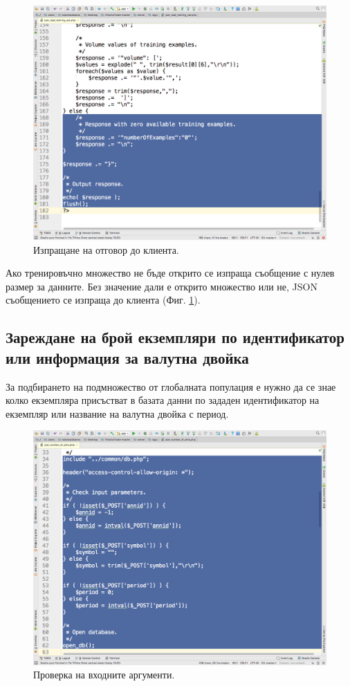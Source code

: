 \documentclass[book,14pt,oneside,openany]{memoir}
\begin{document}
\begin{figure}[h]
  \centering
  \includegraphics[height=0.45\pdfpageheight]{pic0132}
  \caption{Изпращане на отговор до клиента.}
\label{fig:pic0132}
\end{figure}
\FloatBarrier

Ако тренировъчно множество не бъде открито се изпраща съобщение с нулев размер за данните. Без значение дали е открито множество или не, JSON съобщението се изпраща до клиента (Фиг. \ref{fig:pic0132}).

\subsection{Зареждане на брой екземпляри по идентификатор или информация за валутна двойка}

За подбирането на подмножество от глобалната популация е нужно да се знае колко екземпляра присъстват в базата данни по зададен идентификатор на екземпляр или название на валутна двойка с период. 

\begin{figure}[h]
  \centering
  \includegraphics[height=0.45\pdfpageheight]{pic0133}
  \caption{Проверка на входните аргументи.}
\label{fig:pic0133}
\end{figure}
\FloatBarrier
\end{document}
